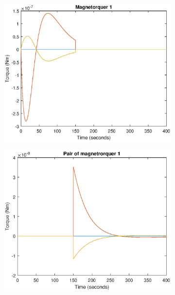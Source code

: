 \begin{figure}[H]
	\begin{subfigure}{0.5\linewidth}
		\centering
		\includegraphics[width=1\linewidth]{figures/config1.eps}
		\caption{}
		\label{fig:magcompens}
	\end{subfigure}
	\begin{subfigure}{0.5\linewidth}
		\centering
		\includegraphics[width=1\linewidth]{figures/config11.eps}
		\label{fig:fig:magcompens2}	
		\caption{}
	\end{subfigure}
\begin{subfigure}{0.5\linewidth}

\end{subfigure}
\end{figure}
